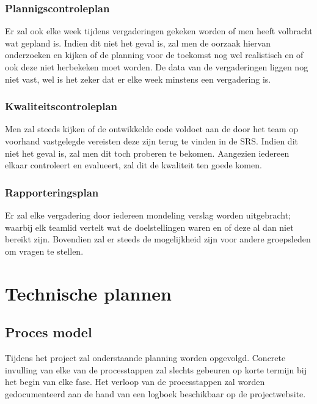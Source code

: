 \documentclass{article}
\begin{document}
\subsubsection{Plannigscontroleplan}

Er zal ook elke week tijdens vergaderingen gekeken worden of men heeft volbracht wat gepland is. Indien dit niet het geval is, zal men de oorzaak hiervan onderzoeken en kijken of de planning voor de toekomst nog wel realistisch en of ook deze niet herbekeken moet worden. De data van de vergaderingen liggen nog niet vast, wel is het zeker dat er elke week minstens een vergadering is.

\subsubsection{Kwaliteitscontroleplan}

Men zal steeds kijken of de ontwikkelde code voldoet aan de door het team op voorhand vastgelegde vereisten deze zijn terug te vinden in de SRS. Indien dit niet het geval is, zal men dit toch proberen te bekomen.
Aangezien iedereen elkaar controleert en evalueert, zal dit de kwaliteit ten goede komen.

\subsubsection{Rapporteringsplan}

Er zal elke vergadering door iedereen mondeling verslag worden uitgebracht; waarbij elk teamlid vertelt wat de doelstellingen waren en of deze al dan niet bereikt zijn. Bovendien zal er steeds de mogelijkheid zijn voor andere groepsleden om vragen te stellen.

\newpage
\section{Technische plannen}

\subsection{Proces model}


Tijdens het project zal onderstaande planning worden opgevolgd. Concrete invulling van elke van de processtappen zal slechts gebeuren op korte termijn bij het begin van elke fase. Het verloop van de processtappen zal worden gedocumenteerd aan de hand van een logboek beschikbaar op de
projectwebsite. \\[3mm]
\end{document}
